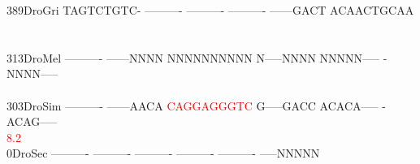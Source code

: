 \documentclass[11pt,twoside,reqno,a4paper]{article}
\begin{document}
{389\hspace*{1\charwidth}DroGri	TAGTCTGTC-	----------	----------	----------	------GACT	ACAACTGCAA	\\
\hspace*{4\charwidth}\hspace*{7\charwidth}\hspace*{1\charwidth}\hspace*{1\charwidth}\hspace*{1\charwidth}\hspace*{1\charwidth}\hspace*{1\charwidth}\hspace*{1\charwidth}\\
\\
313\hspace*{1\charwidth}DroMel	----------	------NNNN	NNNNNNNNNN	N-----NNNN	NNNNN-----	-NNNN-----	\\
\hspace*{4\charwidth}\hspace*{7\charwidth}\hspace*{1\charwidth}\hspace*{1\charwidth}\hspace*{1\charwidth}\hspace*{1\charwidth}\hspace*{1\charwidth}\hspace*{1\charwidth}\\
303\hspace*{1\charwidth}DroSim	----------	------AACA	\textcolor{Red}{C}\textcolor{Red}{A}\textcolor{Red}{G}\textcolor{Red}{G}\textcolor{Red}{A}\textcolor{Red}{G}\textcolor{Red}{G}\textcolor{Red}{G}\textcolor{Red}{T}\textcolor{Red}{C}	G-----GACC	ACACA-----	-ACAG-----	\\
\hspace*{4\charwidth}\hspace*{7\charwidth}\hspace*{1\charwidth}\hspace*{1\charwidth}\hspace*{20\charwidth}\textcolor{Red}{8.2}\hspace*{1\charwidth}\hspace*{1\charwidth}\hspace*{1\charwidth}\hspace*{1\charwidth}\\
0\hspace*{3\charwidth}DroSec	----------	----------	----------	----------	----------	-----NNNNN	\\
}
\end{document}
